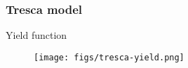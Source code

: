 \documentclass[notes]{beamer}
\begin{document}
\begin{frame}
\frametitle{Tresca model}
Yield function
\begin{figure}
	\texttt{[image: figs/tresca-yield.png]}
\end{figure}
\end{frame}
\end{document}
